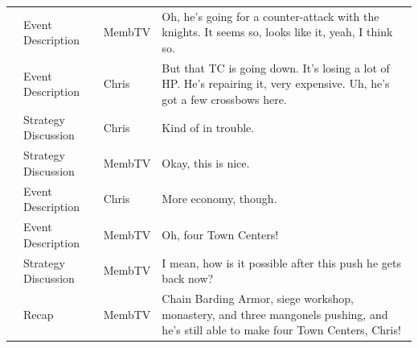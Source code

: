 {\begin{longtable}{@{}>{\theAppRow}r|L{2.3cm}L{1.0cm}U{11.55cm}@{}}
    & Event Description     & MembTV       & Oh, he's going for a counter-attack with the knights. It seems so, looks like it, yeah, I think so.                                                                                                                                                              \\
    & Event Description     & Chris        & But that TC is going down. It's losing a lot of HP. He's repairing it, very expensive. Uh, he's got a few crossbows here.                                                                                                                                        \\
    & Strategy Discussion   & Chris        & Kind of in trouble.                                                                                                                                                                                                                                              \\
    & Strategy Discussion   & MembTV       & Okay, this is nice.                                                                                                                                                                                                                                              \\
    & Event Description     & Chris        & More economy, though.                                                                                                                                                                                                                                            \\
    & Event Description     & MembTV       & Oh, four Town Centers!                                                                                                                                                                                                                                           \\
    & Strategy Discussion   & MembTV       & I mean, how is it possible after this push he gets back now?                                                                                                                                                                                                     \\
    & Recap                 & MembTV       & Chain Barding Armor, siege workshop, monastery, and three mangonels pushing, and he's still able to make four Town Centers, Chris!                                                                                                                               \\

\end{longtable}}
